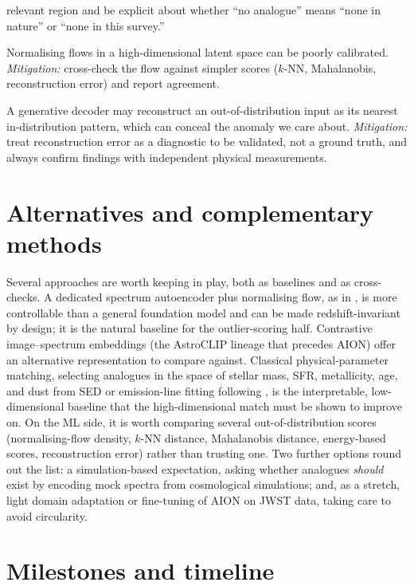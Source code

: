\documentclass[onecolumn,astrosymb,tighten,longbib,trackchanges]{aastex7} %
\newcommand{\aion}{\textsc{AION}\xspace}
\begin{document}
\begin{description}
        relevant region and be explicit about whether ``no analogue'' means ``none in nature'' or
        ``none in this survey.''
  \item[Density estimation in high dimensions.] Normalising flows in a high-dimensional latent space
        can be poorly calibrated. \textit{Mitigation:} cross-check the flow against simpler scores
        ($k$-NN, Mahalanobis, reconstruction error) and report agreement.
  \item[Decoder ``hallucination.''] A generative decoder may reconstruct an out-of-distribution
        input as its nearest in-distribution pattern, which can conceal the anomaly we care about.
        \textit{Mitigation:} treat reconstruction error as a diagnostic to be validated, not a
        ground truth, and always confirm findings with independent physical measurements.
\end{description}


\section{Alternatives and complementary methods} \label{sec:alternatives}

Several approaches are worth keeping in play, both as baselines and as cross-checks. A dedicated
spectrum autoencoder plus normalising flow, as in \citet{Liang2023_outlier_detection}, is more
controllable than a general foundation model and can be made redshift-invariant by design; it is the
natural baseline for the outlier-scoring half. Contrastive image--spectrum embeddings (the AstroCLIP
lineage that precedes \aion) offer an alternative representation to compare against. Classical
physical-parameter matching, selecting analogues in the space of stellar mass, SFR, metallicity,
age, and dust from SED or emission-line fitting following \citet{Bian2016_local_analogues}, is the
interpretable, low-dimensional baseline that the high-dimensional match must be shown to improve on.
On the ML side, it is worth comparing several out-of-distribution scores (normalising-flow density,
$k$-NN distance, Mahalanobis distance, energy-based scores, reconstruction error) rather than
trusting one. Two further options round out the list: a simulation-based expectation, asking whether
analogues \emph{should} exist by encoding mock spectra from cosmological simulations; and, as a
stretch, light domain adaptation or fine-tuning of \aion on JWST data, taking care to avoid
circularity.


\section{Milestones and timeline} \label{sec:milestones}
\end{document}

